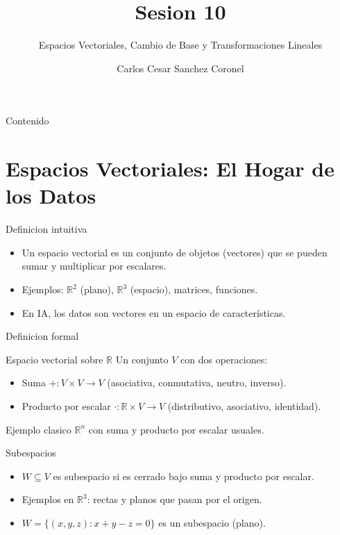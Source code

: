 \documentclass[aspectratio=169, 10pt, xcolor=table]{beamer}
\title[SESION 10 CALCULO]{\textbf{Sesion 10}}
\subtitle{Espacios Vectoriales, Cambio de Base y Transformaciones Lineales}
\author[Prof. C. Sanchez]{Carlos Cesar Sanchez Coronel}
\institute{\textbf{CALCULO Y ALGEBRA LINEAL PARA IA}}
\date{}
\begin{document}
\begin{frame}
    \titlepage
\end{frame}

\begin{frame}{Contenido}
    \tableofcontents
\end{frame}

\section{Espacios Vectoriales: El Hogar de los Datos}

\begin{frame}{Definicion intuitiva}
    \begin{itemize}
        \item Un espacio vectorial es un conjunto de objetos (vectores) que se pueden sumar y multiplicar por escalares.
        \item Ejemplos: $\mathbb{R}^2$ (plano), $\mathbb{R}^3$ (espacio), matrices, funciones.
        \item En IA, los datos son vectores en un espacio de características.
    \end{itemize}
\end{frame}

\begin{frame}{Definicion formal}
    \begin{block}{Espacio vectorial sobre $\mathbb{R}$}
        Un conjunto $V$ con dos operaciones:
        \begin{itemize}
            \item Suma $+ : V\times V \to V$ (asociativa, conmutativa, neutro, inverso).
            \item Producto por escalar $\cdot : \mathbb{R}\times V \to V$ (distributivo, asociativo, identidad).
        \end{itemize}
    \end{block}
    \begin{exampleblock}{Ejemplo clasico}
        $\mathbb{R}^n$ con suma y producto por escalar usuales.
    \end{exampleblock}
\end{frame}

\begin{frame}{Subespacios}
    \begin{itemize}
        \item $W\subseteq V$ es subespacio si es cerrado bajo suma y producto por escalar.
        \item Ejemplos en $\mathbb{R}^3$: rectas y planos que pasan por el origen.
        \item $W = \{(x,y,z): x+y-z=0\}$ es un subespacio (plano).
    \end{itemize}
\end{frame}
\end{document}
